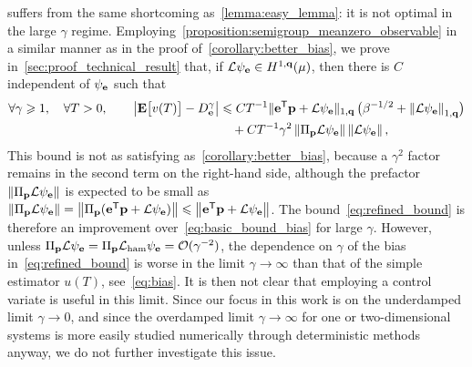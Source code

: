 \documentclass[11pt,a4paper]{article}
\begin{document}
 suffers from the same shortcoming as~\cref{lemma:easy_lemma}:
it is not optimal in the large $\gamma$ regime.
Employing~\cref{proposition:semigroup_meanzero_observable} in a similar manner as in the proof of~\cref{corollary:better_bias},
we prove in~\cref{sec:proof_technical_result} that,
if $\mathcal L \psi_{\boldsymbol{\mathbf e}} \in H^{1,\boldsymbol{\mathbf q}}(\mu)$,
then there is $C$ independent of $\psi_{\boldsymbol{\mathbf e}}$ such that
\begin{align}
    \notag
    \forall \gamma \geq 1, \quad
    \forall T > 0, \qquad
    \abs{\expect \bigl[ v(T) \bigr] - D_{\vect e}^{\gamma}}
        &\leq C T^{-1}
        \norm*{\vect e^\t \vect p +  \mathcal L \psi_{\vect e}}[1,\vect q] \, \bigl(\beta^{-1/2} + \norm{\mathcal L \psi_{\vect e}}[1,\vect q] \bigr) \\
        \label{eq:refined_bound}
        &\quad + C T^{-1} \gamma^2 \norm{\Pi_{\vect p} \mathcal L \psi_{\vect e}} \norm{\mathcal L \psi_{\vect e}},
\end{align}
This bound is not as satisfying as~\cref{corollary:better_bias},
because a $\gamma^2$ factor remains in the second term on the right-hand side,
although the prefactor $\norm{\Pi_{\vect p} \mathcal  L \psi_{\vect e}}$ is expected to be small as~$\norm{\Pi_{\vect p} \mathcal L \psi_{\vect e}} = \norm{\Pi_{\vect p} (\vect e^\t \vect p + \mathcal L \psi_{\vect e})} \leq \norm{\vect e^\t \vect p + \mathcal L \psi_{\vect e}}$.
The bound~\eqref{eq:refined_bound} is therefore an improvement over~\eqref{eq:basic_bound_bias} for large $\gamma$.
However,
unless $\Pi_{\boldsymbol{\mathbf p}} \mathcal L \psi_{\boldsymbol{\mathbf e}} = \Pi_{\boldsymbol{\mathbf p}} \mathcal L_{\rm ham} \psi_{\boldsymbol{\mathbf e}} = \mathcal O(\gamma^{-2})$,
the dependence on $\gamma$ of the bias in~\eqref{eq:refined_bound} is worse in the limit $\gamma \to \infty$
than that of the simple estimator $u(T)$, see~\eqref{eq:bias}.
It is then not clear that employing a control variate is useful in this limit.
Since our focus in this work is on the underdamped limit $\gamma \to 0$,
and since the overdamped limit $\gamma \to \infty$ for one or two-dimensional systems is more easily studied numerically through deterministic methods anyway,
we do not further investigate this issue.
\end{document}
